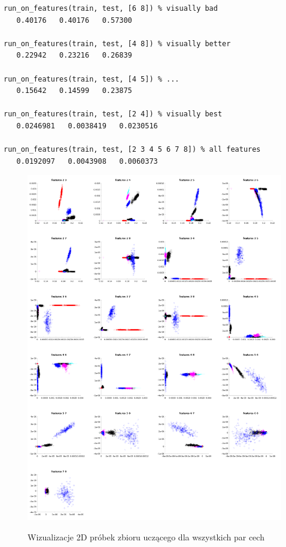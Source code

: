 \documentclass[a4paper]{article}
\begin{document}
\begin{verbatim}
run_on_features(train, test, [6 8]) % visually bad
   0.40176   0.40176   0.57300

run_on_features(train, test, [4 8]) % visually better
   0.22942   0.23216   0.26839

run_on_features(train, test, [4 5]) % ...
   0.15642   0.14599   0.23875

run_on_features(train, test, [2 4]) % visually best
   0.0246981   0.0038419   0.0230516

run_on_features(train, test, [2 3 4 5 6 7 8]) % all features
   0.0192097   0.0043908   0.0060373
\end{verbatim}
\begin{figure}[h]
    \caption[]{Wizualizacje 2D próbek zbioru uczącego dla wszystkich par cech}
    \centering
    \includegraphics[width=1.0\textwidth]{2features.png}
    \label{fig:2D}
\end{figure}
\end{document}
